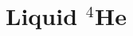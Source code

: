 \documentclass[Thesis.tex]{subfiles}
\begin{document}
\chapter{Liquid $^4$He}
\label{chp:liquid-helium}
\end{document}
